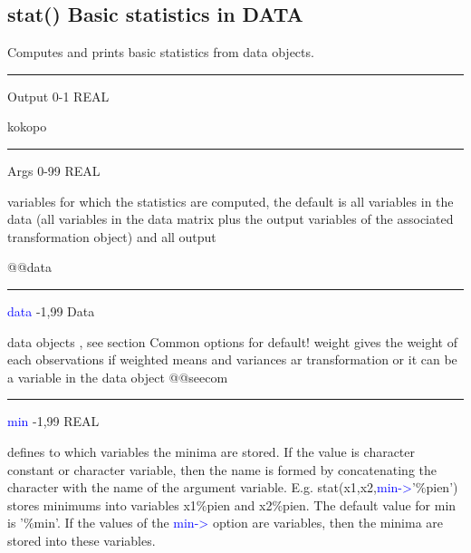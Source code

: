 \subsection{\textcolor{VioletRed}{stat}() Basic statistics in DATA}
\label{stat}
Computes and prints basic statistics from data objects.
\vspace{0.3cm}
\hrule
\vspace{0.3cm}
\noindent Output \tabto{3cm} 0-1 \tabto{5cm}  REAL \tabto{7cm}
\begin{changemargin}{3cm}{0cm}
\noindent  kokopo
\end{changemargin}
\vspace{0.3cm}
\hrule
\vspace{0.3cm}
\noindent Args  \tabto{3cm}  0-99 \tabto{5cm}  REAL \tabto{7cm}
\begin{changemargin}{3cm}{0cm}
\noindent variables for which the statistics are computed,
the default is all variables in the data (all variables in the data matrix plus the output variables of the associated transformation object) and all output

@@data
\end{changemargin}
\vspace{0.3cm}
\hrule
\vspace{0.3cm}
\noindent \textcolor{blue}{data}  \tabto{3cm}  -1,99  \tabto{5cm}   Data  \tabto{7cm}
\begin{changemargin}{3cm}{0cm}
\noindent 	data objects , see section Common options for default! weight 	gives the weight of each observations if weighted means and variances ar
transformation or it can be a variable in the data object
@@seecom
\end{changemargin}
\vspace{0.3cm}
\hrule
\vspace{0.3cm}
\noindent \textcolor{blue}{min}  \tabto{3cm}  -1,99 \tabto{5cm}  REAL \tabto{7cm}
\begin{changemargin}{3cm}{0cm}
\noindent 	defines to which variables the minima are stored.
If the value is character constant or character variable,
then the name is formed by concatenating the character with the name of the argument
variable. E.g. \textcolor{VioletRed}{stat}(x1,x2,\textcolor{blue}{min->}'\%pien') stores minimums into variables
x1\%pien and x2\%pien. The default value for min  is '\%min'.
If the values of the \textcolor{blue}{min->} option are variables,
then the minima are stored into these variables.
\end{changemargin}
\vspace{0.3cm}
